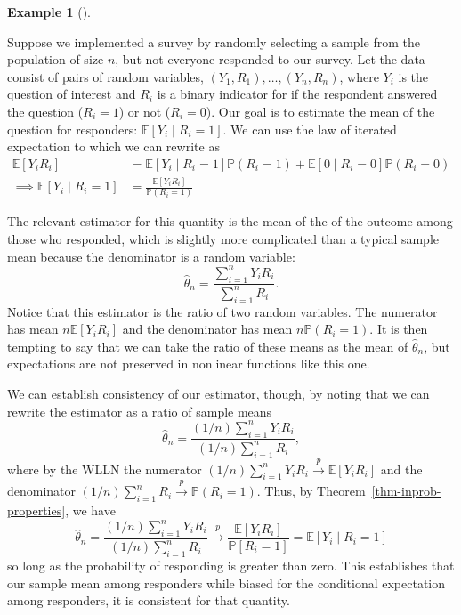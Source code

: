 \documentclass[
  letterpaper,
  DIV=11,
  numbers=noendperiod]{scrreprt}
\newcommand{\E}{\mathbb{E}}
\renewcommand{\P}{\mathbb{P}}
\newcommand{\inprob}{\overset{p}{\to}}
\theoremstyle{definition}
\theoremstyle{plain}
\theoremstyle{definition}
\newtheorem{example}{Example}[chapter]
\theoremstyle{remark}
\begin{document}
\leavevmode{}%
\begin{example}[]\label{exm-nonresponse}

Suppose we implemented a survey by randomly selecting a sample from the
population of size \(n\), but not everyone responded to our survey. Let
the data consist of pairs of random variables,
\((Y_1, R_1), \ldots, (Y_n, R_n)\), where \(Y_i\) is the question of
interest and \(R_i\) is a binary indicator for if the respondent
answered the question (\(R_i = 1\)) or not (\(R_i = 0\)). Our goal is to
estimate the mean of the question for responders:
\(\E[Y_i \mid R_i = 1]\). We can use the law of iterated expectation to
which we can rewrite as \[
\begin{aligned}
\E[Y_iR_i] &= \E[Y_i \mid R_i = 1]\P(R_i = 1) + \E[ 0 \mid R_i = 0]\P(R_i = 0) \\
\implies \E[Y_i \mid R_i = 1] &= \frac{\E[Y_iR_i]}{\P(R_i = 1)}
\end{aligned}
\]

The relevant estimator for this quantity is the mean of the of the
outcome among those who responded, which is slightly more complicated
than a typical sample mean because the denominator is a random variable:
\[
\widehat{\theta}_n = \frac{\sum_{i=1}^n Y_iR_i}{\sum_{i=1}^n R_i}. 
\] Notice that this estimator is the ratio of two random variables. The
numerator has mean \(n\E[Y_iR_i]\) and the denominator has mean
\(n\P(R_i = 1)\). It is then tempting to say that we can take the ratio
of these means as the mean of \(\widehat{\theta}_n\), but expectations
are not preserved in nonlinear functions like this one.

We can establish consistency of our estimator, though, by noting that we
can rewrite the estimator as a ratio of sample means \[
\widehat{\theta}_n = \frac{(1/n)\sum_{i=1}^n Y_iR_i}{(1/n)\sum_{i=1}^n R_i},
\] where by the WLLN the numerator
\((1/n)\sum_{i=1}^n Y_iR_i \inprob \E[Y_iR_i]\) and the denominator
\((1/n)\sum_{i=1}^n R_i \inprob \P(R_i = 1)\). Thus, by
Theorem~\ref{thm-inprob-properties}, we have \[
\widehat{\theta}_n = \frac{(1/n)\sum_{i=1}^n Y_iR_i}{(1/n)\sum_{i=1}^n R_i} \inprob \frac{\E[Y_iR_i]}{\P[R_i = 1]} = \E[Y_i \mid R_i = 1]
\] so long as the probability of responding is greater than zero. This
establishes that our sample mean among responders while biased for the
conditional expectation among responders, it is consistent for that
quantity.

\end{example}
\end{document}
